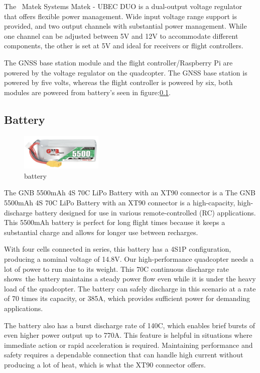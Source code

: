 \documentclass{article}
\begin{document}
The  Matek Systems Matek - UBEC DUO is a dual-output voltage regulator that
offers flexible power management. Wide input voltage range support is provided,
and two output channels with substantial power management. While one channel can
be adjusted between 5V and 12V to accommodate different components, the other is
set at 5V and ideal for receivers or flight controllers.

The GNSS base station module and the flight controller/Raspberry Pi are powered
by the voltage regulator on the quadcopter. The GNSS base station is powered by
five volts, whereas the flight controller is powered by six, both modules are
powered from battery's seen in figure:\ref{battery}.

\subsection{Battery}\label{battery}
\begin{figure}[H]
  \centering
  \includegraphics[width=0.35\textwidth]{Pictures/battery.png}
  \caption{battery}
  \label{fig:battery}
\end{figure}
The GNB 5500mAh 4S 70C LiPo Battery with an XT90 connector is a The GNB 5500mAh
4S 70C LiPo Battery with an XT90 connector is a high-capacity, high-discharge
battery designed for use in various remote-controlled (RC) applications. This
5500mAh battery is perfect for long flight times because it keeps a substantial
charge and allows for longer use between recharges.

With four cells connected in series, this battery has a 4S1P configuration,
producing a nominal voltage of 14.8V. Our high-performance quadcopter needs a
lot of power to run due to its weight. This 70C continuous discharge rate
shows the battery maintains a steady power flow even while it is under the heavy
load of the quadcopter. The battery can safely discharge in this scenario at a
rate of 70 times its capacity, or 385A, which provides sufficient power for
demanding applications.

The battery also has a burst discharge rate of 140C, which enables brief bursts
of even higher power output up to 770A. This feature is helpful in situations
where immediate action or rapid acceleration is required. Maintaining
performance and safety requires a dependable connection that can handle high
current without producing a lot of heat, which is what the XT90 connector
offers.
\end{document}
